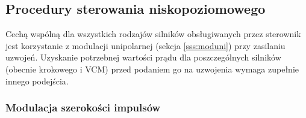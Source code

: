 \subsection{Procedury sterowania niskopoziomowego}
\label{sss:lowlevel}

Cechą wspólną dla wszystkich rodzajów silników obsługiwanych przez sterownik jest korzystanie z modulacji unipolarnej  (sekcja \ref{sss:moduni}) przy zasilaniu uzwojeń. Uzyskanie potrzebnej wartości prądu dla poszczególnych silników (obecnie krokowego i VCM) przed podaniem go na uzwojenia wymaga zupełnie innego podejścia. 

\subsubsection{Modulacja szerokości impulsów}



\clearpage